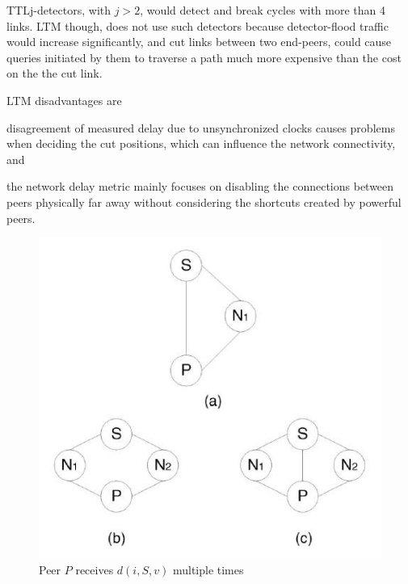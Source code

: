 \documentclass[a4paper,10pt]{article}
\begin{document}
TTLj-detectors, with $j > 2$, would detect and break cycles with more than 4 links. LTM though, does not use such detectors because detector-flood traffic would increase significantly, and cut links between two end-peers, could cause queries initiated by them to traverse a path much more expensive than the cost on the the cut link.

LTM disadvantages are
\begin{inparaenum}
  \item disagreement of measured delay due to unsynchronized clocks causes problems when deciding the cut positions, which can influence the network connectivity, and
  \item the network delay metric mainly focuses on disabling the connections between peers physically far away without considering the shortcuts created by powerful peers.
\end{inparaenum}

\begin{figure}
\centering
  \includegraphics[scale=0.4]{img/ltm_multid.jpeg}
\caption{Peer $P$ receives $d(i, S, v)$ multiple times}
\label{figure:ltm_multid}
\end{figure}
\end{document}
